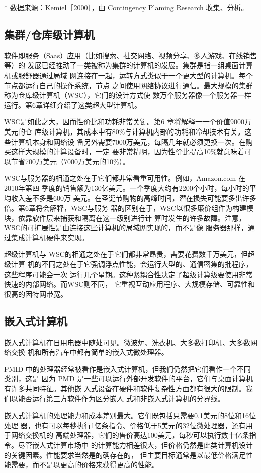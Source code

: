 * 数据来源：Kemiel［2000］，由 Contingency Plaming Research 收集、分析。


\subsection{集群/仓库级计算机}
软件即服务（Saas）应用（比如搜索、社交网络、视频分享、多人游戏、在线销售等）的
发展已经推动了一类被称为集群的计算机的发展。集群是指一组桌面计算机或服舒器通过局域
网连接在一起，运转方式类似于一个更大型的计算机。每个节点都运行自己的操作系统，节点
之间使用网络协议进行通信。最大规模的集群称为仓库级计算机（WSC），它们的设计方式使
数万个服务器像一个服务器一样运行。第6章详细介绍了这类超大型计算机。

WSC是如此之大，因而性价比和功耗非常关键。第6 章将解释一一个价值9000万美元的仓
库级计算机，其成本中有80\%与计算机内部的功耗和冷却技术有关。这些计算机本身和网络设
备另外需要7000万美元，每隔几年就必须更换一次。在购买这样大规模的计算设备时，一定
要非常精明，因为性价比提高10\%就意味着可以节省700万美元（7000万美元的10\%）。

WSC与服务器的相通之处在于它们都非常看重可用性。例如，Amazon.com 在2010年第四
季度的销售额为130亿美元。一个季度大约有2200个小时，每小时的平均收入差不多是600万
美元。在圣诞节购物的高峰时间，潜在损失可能要多出许多倍。第6章将会解释，WSC与服务
器的区别在于，WSC以很多廉价组件为构建模块，依靠软件层来捕获和隔离在这一级别进行计
算时发生的许多故障。注意，WSC的可扩展性是由连接这些计算机的局域网实现的，而不是像
服务器那样，通过集成计算机硬件来实现。

超级计算机与 WSC的相通之处在于它们都非常昂贵，需要花费数千万美元，但超级计算
机的不同之处在于它强调浮点性能，会运行大型的、通信密集的批程序，这些程序可能会一次
运行几个星期。这种紧耦合性决定了超级计算级要使用非常快速的内部网络。而WSC则不同，
它重视互动应用程序、大规模存储、可靠性和很高的因特网带宽。

\subsection{嵌入式计算机}
嵌人式计算机在日用电器中随处可见。微波炉、洗衣机、大多数打印机、大多数网络交换
机和所有汽车中都有简单的嵌入式微处理器。

PMID 中的处理器经常被看作是嵌入式计算机，但我们仍然把它们看作一个不同类别，这是
因为 PMD 是一些可以运行外部开发软件的平台，它们与桌面计算机有许多共同特征。其他嵌
入式设备在硬件和软件复杂性方面都有很大的限制。我们以能否运行第三方软件作为区分嵌人
式和非嵌入式计算机的分界线。

嵌入式计算机的处理能力和成本差别最大。它们既包括只需要0.1美元的8位和16位处理
器，也有可以每秒执行1亿条指令、价格低于5美元的32位微处理器，还有用于网络交换机的
高端处理器，它们的售价高达100美元，每秒可以执行数十亿条指令。尽管嵌人式计算市场中
的计算能力相差很大，但价格仍然是此类计算机设计的关键因素。性能要求当然是的确存在的，
但主要目标通常是以最低价格满足性能需要，而不是以更高的价格来获得更高的性能。

